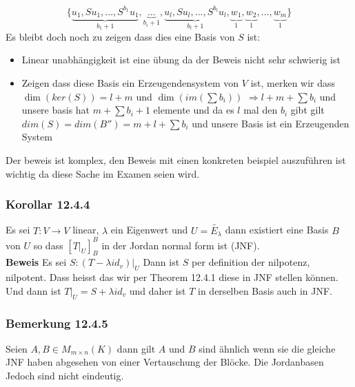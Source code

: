 \documentclass{article}
\newcommand{\korollar}[1]{\subsubsection*{Korollar {#1}}}
\newcommand{\beweis}{\\\textbf{Beweis }}
\newcommand{\bemerkung}[1]{\subsubsection*{Bemerkung {#1}}}
\begin{document}
\[\lbrace \underset{b_1+1}{\underbrace{u_1,Su_1,...,S^{b_1}u_1}},\underset{b_i+1}{\underbrace{\hdots}},\underset{b_l+1}{\underbrace{u_l,Su_l,...,S^{b_l}u_l}}, \underset{1}{\underbrace{w_1}}, \underset{1}{\underbrace{w_2}}, ...,\underset{1}{\underbrace{w_m}}\rbrace\]
Es bleibt doch noch zu zeigen dass dies eine Basis von $S$ ist:
\begin{itemize}
  \item{Linear unabhängigkeit ist eine übung da der Beweis nicht sehr schwierig ist}
  \item{Zeigen dass diese Basis ein Erzeugendensystem von $V$ ist, merken wir dass $\dim(ker(S))=l+m$ und $\dim(im(\sum b_i))$ $\Rightarrow l+m+\sum b_i$ und unsere basis hat $m+\sum b_i+1$ elemente und da es $l$ mal den $b_i$ gibt gilt $dim(S)=dim(B'')=m+l+\sum b_i$ und unsere Basis ist  ein Erzeugenden System}
\end{itemize}
Der beweis ist komplex, den Beweis mit einen konkreten beispiel auszuführen ist wichtig da diese Sache im Examen seien wird.
\korollar{12.4.4} Es sei $T:V\rightarrow V$ linear, $\lambda$ ein Eigenwert und $U=\tilde{E_\lambda}$ dann existiert eine Basis $B$ von $U$ so dass $\left[\left.T\right|_U\right]^B_B$ in der Jordan normal form ist (JNF).
\beweis Es sei $S:\left.(T-\lambda id_v)\right|_U$ Dann ist $S$ per definition der nilpotenz, nilpotent. Dass heisst das wir per Theorem 12.4.1 diese in JNF stellen können. Und dann ist $\left.T\right|_U=S+\lambda id_v$ und daher ist $T$ in derselben Basis auch in JNF.
\bemerkung{12.4.5} Seien $A,B\in M_{m\times n}(K)$ dann gilt $A$ und $B$ sind ähnlich wenn sie die gleiche JNF haben abgesehen von einer Vertauschung der Blöcke. Die Jordanbasen Jedoch sind nicht eindeutig.
\end{document}
